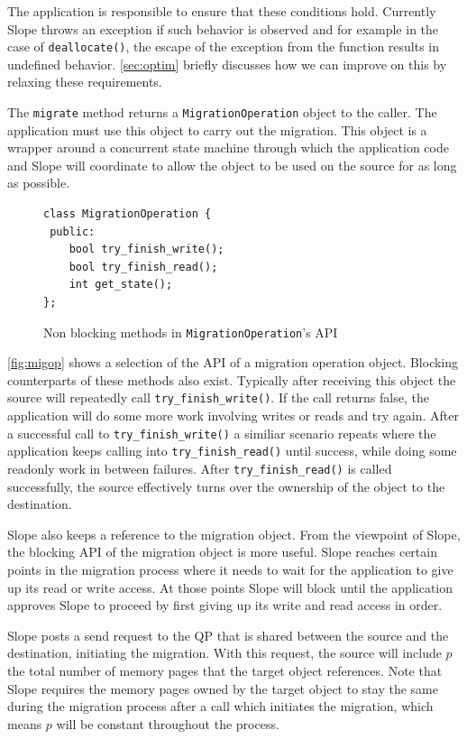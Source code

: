 The application is responsible
to ensure that these conditions hold. Currently Slope throws an exception if such
behavior is observed and for example in the case of \texttt{deallocate()}, the
escape of the exception from the function results in undefined behavior.
\autoref{sec:optim} briefly discusses how we can improve on this by relaxing
these requirements.

The \texttt{migrate} method returns a \texttt{MigrationOperation} object to
the caller. The application must use this object to carry out the migration.
This object is a wrapper around a concurrent state machine through which the
application code and Slope will coordinate to allow the object to be used on
the source for as long as possible.


\begin{figure}[tp]
\begin{lstlisting}
class MigrationOperation {
 public:
    bool try_finish_write();
    bool try_finish_read();
    int get_state();
};
\end{lstlisting}
\caption{
    Non blocking methods in \texttt{MigrationOperation}'s API
}
\label{fig:migop}
\end{figure}

\autoref{fig:migop} shows a selection of the API of a migration operation
object. Blocking counterparts of these methods also exist. Typically after
receiving this object the source will repeatedly call \texttt{try\_finish\_write()}.
If the call returns false, the application will do some more work involving
writes or reads and try again. After a successful call to \texttt{try\_finish\_write()}
a similiar scenario repeats where the application keeps calling into
\texttt{try\_finish\_read()} until success, while doing some readonly work in between
failures. After \texttt{try\_finish\_read()} is called successfully, the source
effectively turns over the ownership of the object to the destination.

Slope also keeps a reference to the migration object. From the viewpoint of
Slope, the blocking API of the migration object is more
useful. Slope reaches certain points in the migration process where it needs to wait
for the application to give up its read or write access. At those points Slope
will block until the application approves Slope to proceed by first giving up
its write and read access in order.

Slope posts a send request to the QP that is shared
between the source and the destination, initiating the migration.
With this request, the source will include $p$ the total number of
memory pages that the target object references. Note that Slope requires the
memory pages owned by the target object to stay the same during the migration
process after a call which initiates the migration, which means $p$ will be
constant throughout the process.

